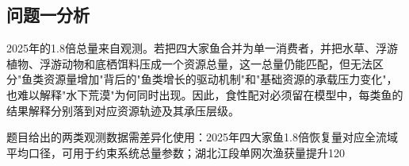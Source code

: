 \subsection{问题一分析}
2025年的1.8倍总量来自观测。若把四大家鱼合并为单一消费者，并把水草、浮游植物、浮游动物和底栖饵料压成一个资源总量，这一总量仍能匹配，但无法区分"鱼类资源量增加"背后的"鱼类增长的驱动机制"和"基础资源的承载压力变化"，也难以解释"水下荒漠"为何同时出现。因此，食性配对必须留在模型中，每类鱼的结果解释分别落到对应资源轨迹及其承压层级。

题目给出的两类观测数据需差异化使用：2025年四大家鱼1.8倍恢复量对应全流域平均口径，可用于约束系统总量参数；湖北江段单网次渔获量提升120%


